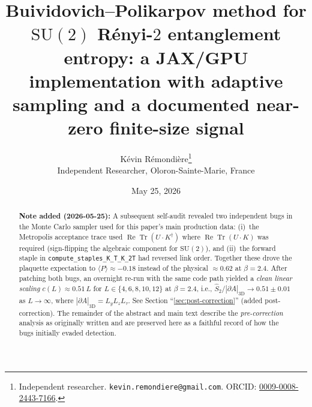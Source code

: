\documentclass[11pt,a4paper]{article}
\title{Buividovich--Polikarpov method for $\mathrm{SU}(2)$ Rényi-$2$
       entanglement entropy: a JAX/GPU implementation
       with adaptive sampling and a documented near-zero finite-size signal}
\author{K\'evin R\'emondi\`ere\thanks{Independent researcher.
        \texttt{kevin.remondiere@gmail.com}.
        ORCID: \href{https://orcid.org/0009-0008-2443-7166}{0009-0008-2443-7166}.}\\
        \small Independent Researcher, Oloron-Sainte-Marie, France}
\date{May 25, 2026}
\theoremstyle{definition}
\newcommand{\Tr}{\operatorname{Tr}}
\renewcommand{\Re}{\operatorname{Re}}
\newcommand{\SUtwo}{\mathrm{SU}(2)}
\begin{document}
\maketitle

\begin{abstract}

\noindent\textbf{Note added (2026-05-25):} A subsequent self-audit
revealed two independent bugs in the Monte Carlo sampler used for
this paper's main production data: (i)~the Metropolis acceptance
trace used $\Re\Tr(U \cdot K^\dagger)$ where $\Re\Tr(U \cdot K)$ was
required (sign-flipping the algebraic component for $\SUtwo$), and
(ii)~the forward staple in \texttt{compute\_staples\_K\_T\_K\_2T} had
reversed link order. Together these drove the plaquette expectation
to $\langle P\rangle \approx -0.18$ instead of the physical
$\approx 0.62$ at $\beta = 2.4$. After patching both bugs, an
overnight re-run with the same code path yielded a \emph{clean
linear scaling} $\widehat c(L) \approx 0.51\,L$ for $L \in
\{4,6,8,10,12\}$ at $\beta = 2.4$, i.e., $\widehat S_2 / |\partial
A|_{3\text{D}} \to 0.51 \pm 0.01$ as $L \to \infty$, where
$|\partial A|_{3\text{D}} = L_y L_z L_\tau$. See Section
``\ref{sec:post-correction}'' (added post-correction). The remainder
of the abstract and main text describe the \emph{pre-correction}
analysis as originally written and are preserved here as a faithful
record of how the bugs initially evaded detection.

\medskip


\end{abstract}
\end{document}
